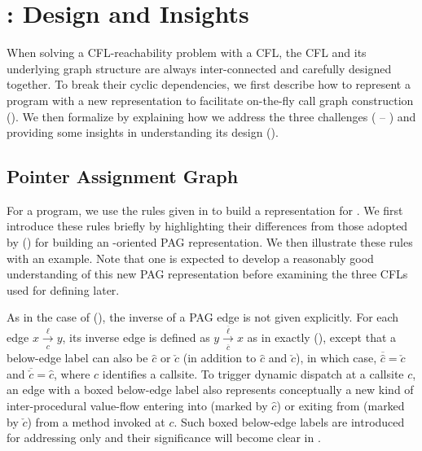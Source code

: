 \section{\texorpdfstring{\LFCR}\,: Design and Insights}
\label{sec:CFL}

When solving a CFL-reachability problem with a CFL, the CFL and its underlying graph
structure are always inter-connected and carefully designed together. To break their cyclic
dependencies, we first describe how to represent a program with a new \pag representation 
to facilitate on-the-fly call graph construction
(). We then
formalize \LFCR by explaining how we address the three challenges
( -- ) and providing some insights
in understanding its design ().


\subsection{Pointer Assignment Graph} 
\label{subsec:newPAG}


For a program, we use the rules given in 
 to build a \pag representation for \LFCR. We first introduce
these rules briefly by highlighting their differences  from those adopted by \manuLFC
() 
for building an \manuLFC-oriented PAG representation. We then illustrate these rules with an example.
Note that one is expected to develop a reasonably good understanding of this new PAG representation before 
examining the three CFLs used for defining
\LFCR later.

As in the case of \manuLFC (), the inverse of a PAG edge
is not given
explicitly. For each \pag edge 
$x\xrightarrow[c]{\ell}y$, its inverse edge is defined as  
$y\xrightarrow[\overline{c}]{\overline{\ell}}x$ as in \manuLFC exactly  (),
except that 
a below-edge label can also be $\hat{\boxed{c}}$ or $\check{\boxed{c}}$
(in addition to $\hat{{c}}$ and $\check{{c}}$), in which case,
$\overline{\hat{\boxed{c}}}=\check{\boxed{c}}$ and $\overline{\check{\boxed{c}}}=\hat{\boxed{c}}$, where $c$ identifies a  callsite.
To trigger dynamic dispatch at a callsite $c$, an edge with a boxed below-edge label also represents conceptually 
a new kind of inter-procedural value-flow entering into (marked by 
$\hat{\boxed{c}}$)
or exiting from (marked by 
$\check{\boxed{c}}$) from a method invoked at  $c$. Such boxed below-edge labels are
introduced for addressing  only and their significance will become clear
in .

